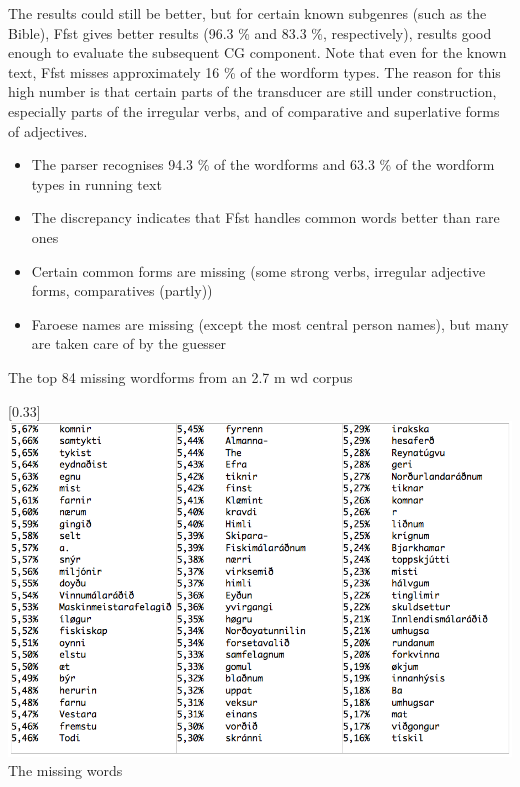 \documentclass{article}
\begin{document}
The results could still be better, but for certain known subgenres (such as the Bible), Ffst gives better results (96.3 \% and 83.3 \%, respectively), results good enough to evaluate the subsequent CG component. Note that even for the known text, Ffst misses approximately 16 \% of the wordform types. The reason for this high number is that certain parts of the transducer are still under construction, especially parts of the irregular verbs, and of comparative and superlative forms of adjectives.

\begin{itemize}
\item The parser recognises 94.3 \% of the wordforms and 63.3  \% of the wordform types in running text
\item The discrepancy indicates that Ffst handles common words better than rare ones
\item{Certain common forms are missing (some strong verbs, irregular adjective forms, comparatives (partly))}
\item{Faroese names are missing (except the most central person names), but many are taken care of by the guesser}
\end{itemize}


The top 84 missing wordforms from an 2.7 m wd corpus

\scalebox{0.33}[0.33]{\includegraphics{img/missing.png}} \\


The missing words
\end{document}
